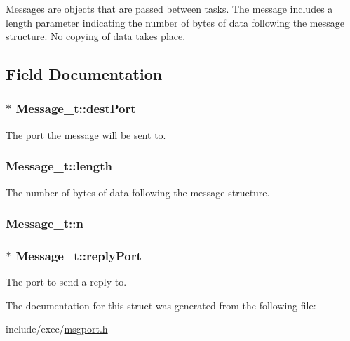 Messages are objects that are passed between tasks. The message includes a length parameter indicating the number of bytes of data following the message structure. No copying of data takes place. 

\subsection{Field Documentation}
\hypertarget{structMessage__t_a6cac91bef9fe2098eb00caf47c1afd14}{
\subsubsection[{dest\+Port}]{$\ast$ Message\+\_\+t\+::dest\+Port}}\label{structMessage__t_a6cac91bef9fe2098eb00caf47c1afd14}


The port the message will be sent to. 

\hypertarget{structMessage__t_a9c626cb2daa6618f78bc294c9e999600}{
\subsubsection[{length}]{ Message\+\_\+t\+::length}}\label{structMessage__t_a9c626cb2daa6618f78bc294c9e999600}


The number of bytes of data following the message structure. 

\hypertarget{structMessage__t_ad39202c787bca02f4dc0dce9f60caead}{
\subsubsection[{n}]{ Message\+\_\+t\+::n}}\label{structMessage__t_ad39202c787bca02f4dc0dce9f60caead}
\hypertarget{structMessage__t_af901b37fc1bb20d21385423fde383058}{
\subsubsection[{reply\+Port}]{$\ast$ Message\+\_\+t\+::reply\+Port}}\label{structMessage__t_af901b37fc1bb20d21385423fde383058}


The port to send a reply to. 



The documentation for this struct was generated from the following file\+:\begin{DoxyCompactItemize}
\item 
include/exec/\hyperlink{msgport_8h}{msgport.\+h}\end{DoxyCompactItemize}
